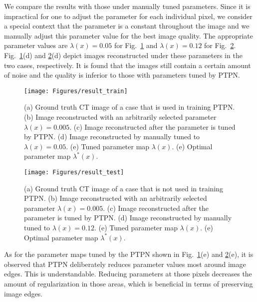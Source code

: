 \documentclass[journal]{IEEEtran}
\begin{document}
We compare the results with those under manually tuned parameters. Since it is impractical for one to adjust the parameter for each individual pixel, we consider a special context that the parameter is a constant throughout the image and we manually adjust this parameter value for the best image quality. The appropriate parameter values are $\lambda(x)=0.05$ for Fig.~\ref{Fig:result_train} and $\lambda(x) = 0.12$ for Fig.~\ref{Fig:result_test}. Fig.~\ref{Fig:result_train}(d) and \ref{Fig:result_test}(d) depict images reconstructed under these parameters in the two cases, respectively. It is found that the images still contain a certain amount of noise and the quality is inferior to those with parameters tuned by PTPN. 

\begin{figure}
	\centering
  	\texttt{[image: Figures/result\_train]}
  	\caption{(a) Ground truth CT image of a case that is used in training PTPN. (b) Image reconstructed with an arbitrarily selected parameter $\lambda(x) = 0.005$. (c) Image reconstructed after the parameter is tuned by PTPN. (d) Image reconstructed by manually tuned to $\lambda(x) = 0.05$. (e) Tuned parameter map $\lambda(x)$. (e) Optimal parameter map $\lambda^*(x)$.  }
  \label{Fig:result_train}
\end{figure}

\begin{figure}[b]
	\centering
  	\texttt{[image: Figures/result\_test]}
  	\caption{(a) Ground truth CT image of a case that is not used in training PTPN. (b) Image reconstructed with an arbitrarily selected parameter $\lambda(x) =0.005$. (c) Image reconstructed after the parameter is tuned by PTPN. (d) Image reconstructed by manually tuned to $\lambda(x) = 0.12$. (e) Tuned parameter map $\lambda(x)$. (e) Optimal parameter map $\lambda^*(x)$.  }
  \label{Fig:result_test}
\end{figure}

As for the parameter maps tuned by the PTPN shown in Fig.~\ref{Fig:result_train}(e) and \ref{Fig:result_test}(e), it is observed that PTPN deliberately reduces parameter values most around image edges. This is understandable. Reducing parameters at those pixels decreases the amount of regularization in those areas, which is beneficial in terms of preserving image edges. 
\end{document}

